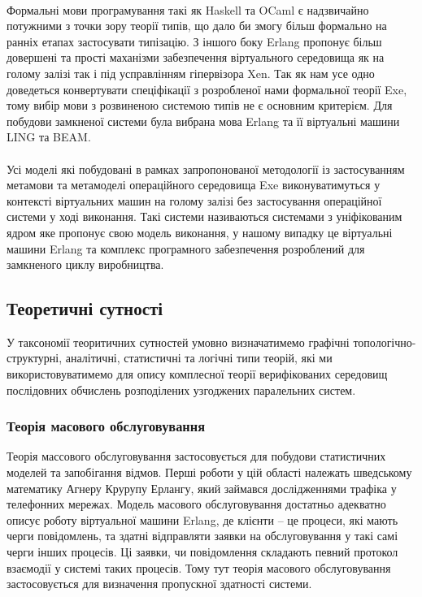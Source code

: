 \documentclass[11pt,oneside]{article}
\begin{document}
   \paragraph{}
   Формальні мови програмування такі як Haskell та OCaml є надзвичайно потужними з точки зору теорії типів,
   що дало би змогу більш формально на ранніх етапах застосувати типізацію. З іншого боку Erlang пропонує
   більш довершені та прості маханізми забезпечення віртуального середовища як на голому залізі так і
   під усправлінням гіпервізора Xen. Так як нам усе одно доведеться конвертувати спеціфікації з
   розробленої нами формальної теорії Exe, тому вибір мови з розвиненою системою типів не є основним критерієм.
   Для побудови замкненої системи була вибрана мова Erlang та її віртуальні машини LING та BEAM.

   \paragraph{}
   Усі моделі які побудовані в рамках запропонованої методології із застосуванням
   метамови та метамоделі операційного середовища Exe виконуватимуться у контексті
   віртуальних машин на голому залізі без застосування операційної системи у ході виконання.
   Такі системи називаються системами з уніфікованим ядром яке пропонує свою модель виконання,
   у нашому випадку це віртуальні машини Erlang та комплекс програмного забезпечення
   розроблений для замкненого циклу виробництва.

\newpage
\subsection{Теоретичні сутності}
\vspace{0.5cm}
   У таксономії теоритичних сутностей умовно визначатимемо
   графічні топологічно- структурні, аналітичні, статистичні та логічні типи теорій, які
   ми використовуватимемо для опису комплесної теорії верифікованих середовищ
   послідовних обчислень розподілених узгоджених паралельних систем.\\

   \subsubsection*{Теорія масового обслуговування}
   Теорія массового обслуговування застосовується для побудови
   статистичних моделей та запобігання відмов. Перші роботи у цій області
   належать шведському математику Агнеру Крурупу Ерлангу, який займався
   дослідженнями трафіка у телефонних мережах. Модель масового обслуговування достатньо
   адекватно описує роботу віртуальної машини Erlang, де клієнти -- це процеси,
   які мають черги повідомлень, та здатні відправляти заявки на обслуговування
   у такі самі черги інших процесів. Ці заявки, чи повідомлення складають певний
   протокол взаємодії у системі таких процесів. Тому тут теорія масового обслуговування
   застосовується для визначення пропускної здатності системи.
\end{document}
